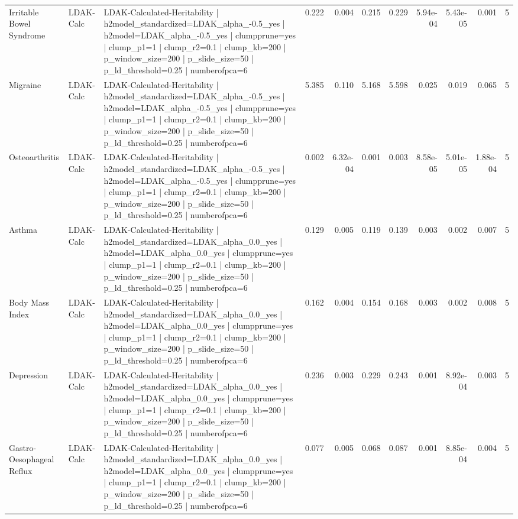 \begin{landscape}
\begin{longtable}{p{2.4cm}p{1.8cm}p{6.0cm}rrrrrrrr}
Irritable Bowel Syndrome & LDAK-Calc & LDAK-Calculated-Heritability | h2model\_standardized=LDAK\_alpha\_-0.5\_yes | h2model=LDAK\_alpha\_-0.5\_yes | clumpprune=yes | clump\_p1=1 | clump\_r2=0.1 | clump\_kb=200 | p\_window\_size=200 | p\_slide\_size=50 | p\_ld\_threshold=0.25 | numberofpca=6 & 0.222 & 0.004 & 0.215 & 0.229 & 5.94e-04 & 5.43e-05 & 0.001 & 5 \\
Migraine & LDAK-Calc & LDAK-Calculated-Heritability | h2model\_standardized=LDAK\_alpha\_-0.5\_yes | h2model=LDAK\_alpha\_-0.5\_yes | clumpprune=yes | clump\_p1=1 | clump\_r2=0.1 | clump\_kb=200 | p\_window\_size=200 | p\_slide\_size=50 | p\_ld\_threshold=0.25 | numberofpca=6 & 5.385 & 0.110 & 5.168 & 5.598 & 0.025 & 0.019 & 0.065 & 5 \\
Osteoarthritis & LDAK-Calc & LDAK-Calculated-Heritability | h2model\_standardized=LDAK\_alpha\_-0.5\_yes | h2model=LDAK\_alpha\_-0.5\_yes | clumpprune=yes | clump\_p1=1 | clump\_r2=0.1 | clump\_kb=200 | p\_window\_size=200 | p\_slide\_size=50 | p\_ld\_threshold=0.25 | numberofpca=6 & 0.002 & 6.32e-04 & 0.001 & 0.003 & 8.58e-05 & 5.01e-05 & 1.88e-04 & 5 \\
Asthma & LDAK-Calc & LDAK-Calculated-Heritability | h2model\_standardized=LDAK\_alpha\_0.0\_yes | h2model=LDAK\_alpha\_0.0\_yes | clumpprune=yes | clump\_p1=1 | clump\_r2=0.1 | clump\_kb=200 | p\_window\_size=200 | p\_slide\_size=50 | p\_ld\_threshold=0.25 | numberofpca=6 & 0.129 & 0.005 & 0.119 & 0.139 & 0.003 & 0.002 & 0.007 & 5 \\
Body Mass Index & LDAK-Calc & LDAK-Calculated-Heritability | h2model\_standardized=LDAK\_alpha\_0.0\_yes | h2model=LDAK\_alpha\_0.0\_yes | clumpprune=yes | clump\_p1=1 | clump\_r2=0.1 | clump\_kb=200 | p\_window\_size=200 | p\_slide\_size=50 | p\_ld\_threshold=0.25 | numberofpca=6 & 0.162 & 0.004 & 0.154 & 0.168 & 0.003 & 0.002 & 0.008 & 5 \\
Depression & LDAK-Calc & LDAK-Calculated-Heritability | h2model\_standardized=LDAK\_alpha\_0.0\_yes | h2model=LDAK\_alpha\_0.0\_yes | clumpprune=yes | clump\_p1=1 | clump\_r2=0.1 | clump\_kb=200 | p\_window\_size=200 | p\_slide\_size=50 | p\_ld\_threshold=0.25 | numberofpca=6 & 0.236 & 0.003 & 0.229 & 0.243 & 0.001 & 8.92e-04 & 0.003 & 5 \\
Gastro-Oesophageal Reflux & LDAK-Calc & LDAK-Calculated-Heritability | h2model\_standardized=LDAK\_alpha\_0.0\_yes | h2model=LDAK\_alpha\_0.0\_yes | clumpprune=yes | clump\_p1=1 | clump\_r2=0.1 | clump\_kb=200 | p\_window\_size=200 | p\_slide\_size=50 | p\_ld\_threshold=0.25 | numberofpca=6 & 0.077 & 0.005 & 0.068 & 0.087 & 0.001 & 8.85e-04 & 0.004 & 5 \\

\end{longtable}
\end{landscape}
